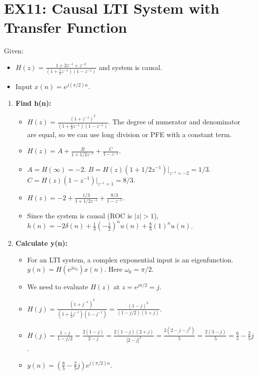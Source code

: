 \documentclass[a4paper,12pt]{article}
\begin{document}
\section*{EX11: Causal LTI System with Transfer Function}
Given:
\begin{itemize}
    \item $H(z) = \frac{1+2z^{-1}+z^{-2}}{(1+\frac{1}{2}z^{-1})(1-z^{-1})}$ and system is causal.
    \item Input $x(n) = e^{j(\pi/2)n}$.
\end{itemize}
\begin{enumerate}
    \item \textbf{Find h(n):}
        \begin{itemize}
            \item $H(z) = \frac{(1+z^{-1})^2}{(1+\frac{1}{2}z^{-1})(1-z^{-1})}$. The degree of numerator and denominator are equal, so we can use long division or PFE with a constant term.
            \item $H(z) = A + \frac{B}{1+1/2 z^{-1}} + \frac{C}{1-z^{-1}}$.
            \item $A=H(\infty)=-2$. $B = H(z)(1+1/2 z^{-1}) |_{z^{-1}=-2} = 1/3$. $C = H(z)(1-z^{-1}) |_{z^{-1}=1} = 8/3$.
            \item $H(z) = -2 + \frac{1/3}{1+1/2 z^{-1}} + \frac{8/3}{1-z^{-1}}$.
            \item Since the system is causal (ROC is $|z|>1$),
            $h(n) = -2\delta(n) + \frac{1}{3}(-\frac{1}{2})^n u(n) + \frac{8}{3}(1)^n u(n)$.
        \end{itemize}
    \item \textbf{Calculate y(n):}
        \begin{itemize}
            \item For an LTI system, a complex exponential input is an eigenfunction. $y(n) = H(e^{j\omega_0}) x(n)$. Here $\omega_0=\pi/2$.
            \item We need to evaluate $H(z)$ at $z=e^{j\pi/2}=j$.
            \item $H(j) = \frac{(1+j^{-1})^2}{(1+\frac{1}{2}j^{-1})(1-j^{-1})} = \frac{(1-j)^2}{(1-j/2)(1+j)}$.
            \item $H(j) = \frac{1-j}{1-j/2} = \frac{2(1-j)}{2-j} = \frac{2(1-j)(2+j)}{|2-j|^2} = \frac{2(2-j-j^2)}{5} = \frac{2(3-j)}{5} = \frac{6}{5} - \frac{2}{5}j$.
            \item $y(n) = (\frac{6}{5} - \frac{2}{5}j) e^{j(\pi/2)n}$.
        \end{itemize}
\end{enumerate}
\end{document}
